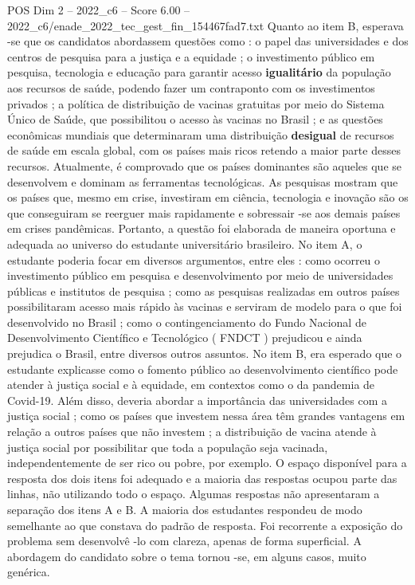 \begin{textsample}{POS Dim 2 – 2022\_c6 – Score 6.00 – 2022\_c6/enade\_2022\_tec\_gest\_fin\_154467fad7.txt}
Quanto ao item B, esperava -se que os candidatos abordassem questões como : o papel das universidades e dos centros de pesquisa para a justiça e a equidade ; o investimento público em pesquisa, tecnologia e educação para garantir acesso \textbf{igualitário} da população aos recursos de saúde, podendo fazer um contraponto com os investimentos privados ; a política de distribuição de vacinas gratuitas por meio do Sistema Único de Saúde, que possibilitou o acesso às vacinas no Brasil ; e as questões econômicas mundiais que determinaram uma distribuição \textbf{desigual} de recursos de saúde em escala global, com os países mais ricos retendo a maior parte desses recursos.
Atualmente, é comprovado que os países dominantes são aqueles que se desenvolvem e dominam as ferramentas tecnológicas.
As pesquisas mostram que os países que, mesmo em crise, investiram em ciência, tecnologia e inovação são os que conseguiram se reerguer mais rapidamente e sobressair -se aos demais países em crises pandêmicas.
Portanto, a questão foi elaborada de maneira oportuna e adequada ao universo do estudante universitário brasileiro.
No item A, o estudante poderia focar em diversos argumentos, entre eles : como ocorreu o investimento público em pesquisa e desenvolvimento por meio de universidades públicas e institutos de pesquisa ; como as pesquisas realizadas em outros países possibilitaram acesso mais rápido às vacinas e serviram de modelo para o que foi desenvolvido no Brasil ; como o contingenciamento do Fundo Nacional de Desenvolvimento Científico e Tecnológico ( FNDCT ) prejudicou e ainda prejudica o Brasil, entre diversos outros assuntos.
No item B, era esperado que o estudante explicasse como o fomento público ao desenvolvimento científico pode atender à justiça social e à equidade, em contextos como o da pandemia de Covid-19.
Além disso, deveria abordar a importância das universidades com a justiça social ; como os países que investem nessa área têm grandes vantagens em relação a outros países que não investem ; a distribuição de vacina atende à justiça social por possibilitar que toda a população seja vacinada, independentemente de ser rico ou pobre, por exemplo.
O espaço disponível para a resposta dos dois itens foi adequado e a maioria das respostas ocupou parte das linhas, não utilizando todo o espaço.
Algumas respostas não apresentaram a separação dos itens A e B.
A maioria dos estudantes respondeu de modo semelhante ao que constava do padrão de resposta.
Foi recorrente a exposição do problema sem desenvolvê -lo com clareza, apenas de forma superficial.
A abordagem do candidato sobre o tema tornou -se, em alguns casos, muito genérica.

\end{textsample}
